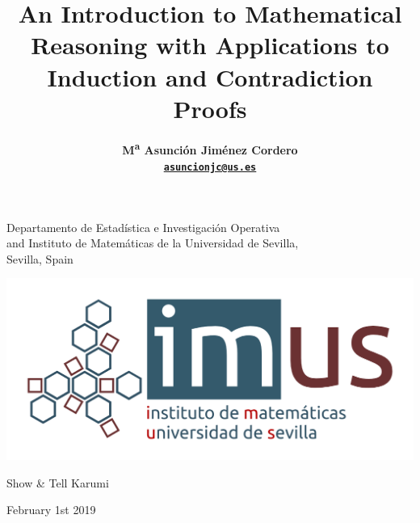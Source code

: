 \documentclass[11pt,a4paper,xcolor=dvipsnames, leqno]{beamer}
\title[Introduction to Mathematical
Reasoning. Induction \& Contradiction Proofs]{An Introduction to Mathematical
Reasoning with Applications to
Induction and Contradiction Proofs}
\author[M\textsuperscript{a} Asunci\'on Jim\'enez Cordero]
{{{\bf M\textsuperscript{a} Asunci\'on Jim\'enez Cordero\\
{\href{mailto:asuncionjc@us.es}{\tt asuncionjc@us.es}}}}}
\institute{Show & Tell Karumi} %
\date{}
\begin{document}
\begingroup 
    \begin{frame}
        \titlepage
\begin{center}
\insertauthor\par
\end{center}
\begin{center}
        \scriptsize Departamento de Estad\'istica e Investigaci\'on Operativa\\ and Instituto de Matem\'aticas de la Universidad de Sevilla,\\
        Sevilla, Spain
        \end{center}
        
\vspace*{0.3cm}
\begin{center}
\includegraphics[scale=0.35]{imus_basico_oct.png}
\end{center}
\begin{center}
\scriptsize{Show \& Tell Karumi}
\end{center}
\begin{center}
\footnotesize{February 1st 2019}
\end{center}
\end{frame}
\endgroup
\end{document}
